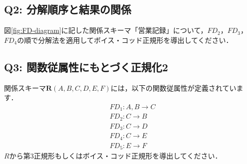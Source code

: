 \subsection*{Q2: 分解順序と結果の関係}
図\ref{fig:FD-diagram}に記した関係スキーマ「営業記録」について，$FD_2$，$FD_3$，$FD_4$の順で分解法を適用してボイス・コッド正規形を導出してください．


\subsection*{Q3: 関数従属性にもとづく正規化2}
関係スキーマ$\boldsymbol{R}(A, B, C, D, E, F)$には，以下の関数従属性が定義されています．
\begin{align}
&FD_1: A, B \to C \nonumber \\
&FD_2: C \to B \nonumber \\
&FD_3: C \to D \nonumber \\
&FD_4: C \to E \nonumber \\
&FD_5: E \to F \nonumber
\end{align}
$R$から第3正規形もしくはボイス・コッド正規形を導出してください．



